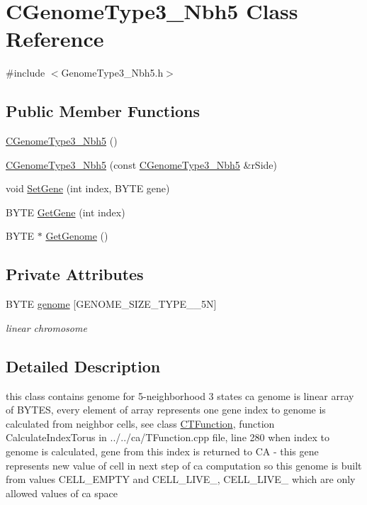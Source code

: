 \hypertarget{classCGenomeType3__Nbh5}{
\section{CGenomeType3\_\-Nbh5 Class Reference}
\label{classCGenomeType3__Nbh5}
}


{\ttfamily \#include $<$GenomeType3\_\-Nbh5.h$>$}\subsection*{Public Member Functions}
\begin{DoxyCompactItemize}
\item 
\hyperlink{classCGenomeType3__Nbh5_aac066e1b9e6a449222640dcf05abe61e}{CGenomeType3\_\-Nbh5} ()
\item 
\hyperlink{classCGenomeType3__Nbh5_af9a34e8230071e6e96e3d8abc777126f}{CGenomeType3\_\-Nbh5} (const \hyperlink{classCGenomeType3__Nbh5}{CGenomeType3\_\-Nbh5} \&rSide)
\item 
void \hyperlink{classCGenomeType3__Nbh5_ab1f7ad4c4653cad4838444fc2a5d6da4}{SetGene} (int index, BYTE gene)
\item 
BYTE \hyperlink{classCGenomeType3__Nbh5_a10f62165a4fc1a9017c5ef10000f87f1}{GetGene} (int index)
\item 
BYTE $\ast$ \hyperlink{classCGenomeType3__Nbh5_a42a24d3581a7779622c0871a92a0f97e}{GetGenome} ()
\end{DoxyCompactItemize}
\subsection*{Private Attributes}
\begin{DoxyCompactItemize}
\item 
\hypertarget{classCGenomeType3__Nbh5_a65d125f2e98f131d61da0c52e750bf1e}{
BYTE \hyperlink{classCGenomeType3__Nbh5_a65d125f2e98f131d61da0c52e750bf1e}{genome} \mbox{[}GENOME\_\-SIZE\_\-TYPE\_\_\-5N\mbox{]}}
\label{classCGenomeType3__Nbh5_a65d125f2e98f131d61da0c52e750bf1e}

\begin{DoxyCompactList}\small\item\em linear chromosome \item\end{DoxyCompactList}\end{DoxyCompactItemize}


\subsection{Detailed Description}
this class contains genome for 5-\/neighborhood 3 states ca genome is linear array of BYTES, every element of array represents one gene index to genome is calculated from neighbor cells, see class \hyperlink{classCTFunction}{CTFunction}, function CalculateIndexTorus in ../../ca/TFunction.cpp file, line 280 when index to genome is calculated, gene from this index is returned to CA -\/ this gene represents new value of cell in next step of ca computation so this genome is built from values CELL\_\-EMPTY and CELL\_\-LIVE\_, CELL\_\-LIVE\_ which are only allowed values of ca space 

